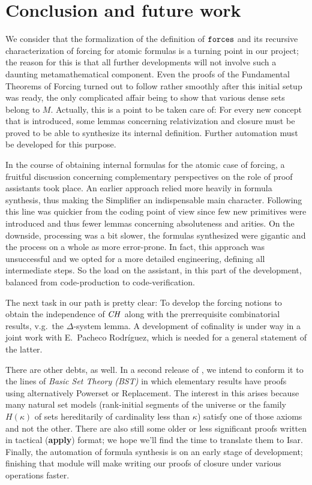 \section{Conclusion and future work}
\label{sec:conclusion}

We consider that the formalization of the definition of $\mathop{\mathtt{forces}}$
and its recursive characterization of forcing for atomic formulas is
a turning point
in our project; the reason for this is that all further
developments will not involve such a daunting metamathematical
component. Even the proofs of the Fundamental Theorems of Forcing
turned out to follow rather smoothly after this initial setup was
ready, the only complicated affair being to show that various dense sets belong
to $M$. 
%
Actually, this is a point to be taken care of: For every new
concept that is introduced, some lemmas concerning 
relativization and closure must be proved to be able to synthesize its
internal definition. Further automation must be developed for this
purpose.

In the course of obtaining internal formulas for the atomic case of
forcing, a fruitful discussion
concerning complementary perspectives on the role of proof assistants
took place. An earlier approach relied more heavily in formula
synthesis, thus making the Simplifier an indispensable main
character. Following this line was quickier from the coding point of
view since few new primitives were introduced and thus fewer lemmas
concerning absoluteness and arities. On the downside, processing was a
bit slower, the formulas synthesized were gigantic and the process on
a whole as more error-prone. In fact, this approach was unsuccessful
and we opted for a more detailed engineering, defining all
intermediate steps. So the load on the assistant, in this part of the
development, balanced from code-production to code-verification. 

The next task in our path is pretty clear: To develop the forcing
notions to obtain the independence of $\mathit{CH}$ 
along with the prerrequisite combinatorial results, v.g.\ the
$\Delta$-system lemma. A development of cofinality is under way in a
joint work with E.~Pacheco Rodríguez, which is needed for a general
statement of the latter. 

There are other debts, as well. In a second
release of , we intend to conform it to the
lines of \emph{Basic Set Theory (BST)} \cite[I.3.1]{kunen2011set} in
which elementary results have proofs using alternatively Powerset or
Replacement. The interest in this arises because many natural set
models
(rank-initial segments of the universe or the family $H(\kappa)$ of
sets hereditarily of cardinality less than $\kappa$) satisfy one of
those axioms and not the other. There are also still some older or
less significant proofs written in tactical (\textbf{apply}) format; we
hope we'll find the time to translate them to Isar. Finally, the
automation of formula synthesis is on an early stage of
development;  finishing that module will make writing our proofs of closure
under various operations faster.


